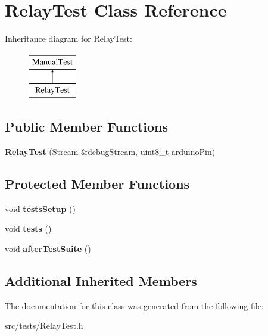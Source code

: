 \hypertarget{class_relay_test}{}\section{Relay\+Test Class Reference}
\label{class_relay_test}
Inheritance diagram for Relay\+Test\+:\begin{figure}[H]
\begin{center}
\leavevmode
\includegraphics[height=2.000000cm]{class_relay_test}
\end{center}
\end{figure}
\subsection*{Public Member Functions}
\begin{DoxyCompactItemize}
\item 
\mbox{\label{class_relay_test_abaee9a70df57128ba571b69fc784c258}} 
{\bfseries Relay\+Test} (Stream \&debug\+Stream, uint8\+\_\+t arduino\+Pin)
\end{DoxyCompactItemize}
\subsection*{Protected Member Functions}
\begin{DoxyCompactItemize}
\item 
\mbox{\label{class_relay_test_a1644f898816a9c6cf57e6cc1c73bdc24}} 
void {\bfseries tests\+Setup} ()
\item 
\mbox{\label{class_relay_test_a15a64ece66ce3f6a9ea09101d744e73b}} 
void {\bfseries tests} ()
\item 
\mbox{\label{class_relay_test_aaa61a82f1eb59f1b93085478f029c741}} 
void {\bfseries after\+Test\+Suite} ()
\end{DoxyCompactItemize}
\subsection*{Additional Inherited Members}


The documentation for this class was generated from the following file\+:\begin{DoxyCompactItemize}
\item 
src/tests/Relay\+Test.\+h\end{DoxyCompactItemize}
